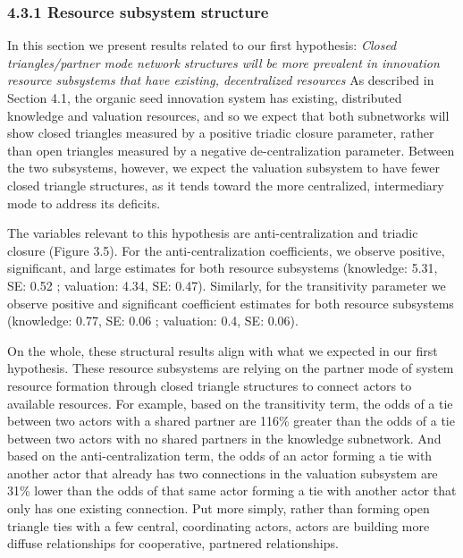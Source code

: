 \documentclass[twoside,12pt,final]{ucthesis-CA2012}
\begin{document}
\begin{ucmainmatter}
\hypertarget{resource-subsystem-structure}{%
\subsubsection{4.3.1 Resource subsystem structure}\label{resource-subsystem-structure}}

In this section we present results related to our first hypothesis:
\emph{Closed triangles/partner mode network structures will be more prevalent
in innovation resource subsystems that have existing, decentralized
resources} As described in Section 4.1, the organic seed innovation
system has existing, distributed knowledge and valuation resources, and
so we expect that both subnetworks will show closed triangles measured
by a positive triadic closure parameter, rather than open triangles
measured by a negative de-centralization parameter. Between the two
subsystems, however, we expect the valuation subsystem to have fewer
closed triangle structures, as it tends toward the more centralized,
intermediary mode to address its deficits.

The variables relevant to this hypothesis are anti-centralization and
triadic closure (Figure 3.5). For the anti-centralization coefficients,
we observe positive, significant, and large estimates for both resource
subsystems (knowledge: 5.31, SE: 0.52 ; valuation: 4.34, SE: 0.47).
Similarly, for the transitivity parameter we observe positive and
significant coefficient estimates for both resource subsystems
(knowledge: 0.77, SE: 0.06 ; valuation: 0.4, SE: 0.06).

On the whole, these structural results align with what we expected in
our first hypothesis. These resource subsystems are relying on the
partner mode of system resource formation through closed triangle
structures to connect actors to available resources. For example, based
on the transitivity term, the odds of a tie between two actors with a
shared partner are 116\% greater than the odds of a tie between two
actors with no shared partners in the knowledge subnetwork. And based on
the anti-centralization term, the odds of an actor forming a tie with
another actor that already has two connections in the valuation
subsystem are 31\% lower than the odds of that same actor forming a tie
with another actor that only has one existing connection. Put more
simply, rather than forming open triangle ties with a few central,
coordinating actors, actors are building more diffuse relationships for
cooperative, partnered relationships.


\end{ucmainmatter}
\end{document}
